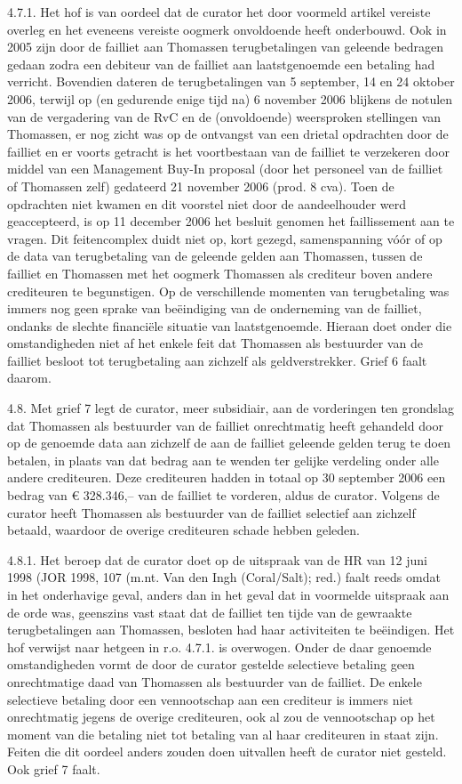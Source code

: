 \documentclass[
  dutch,
  a4paper,
]{article}
\begin{document}
4.7.1. Het hof is van oordeel dat de curator het door voormeld artikel vereiste overleg en het eveneens vereiste oogmerk onvoldoende heeft onderbouwd. Ook in 2005 zijn door de failliet aan Thomassen terugbetalingen van geleende bedragen gedaan zodra een debiteur van de failliet aan laatstgenoemde een betaling had verricht. Bovendien dateren de terugbetalingen van 5 september, 14 en 24 oktober 2006, terwijl op (en gedurende enige tijd na) 6 november 2006 blijkens de notulen van de vergadering van de RvC en de (onvoldoende) weersproken stellingen van Thomassen, er nog zicht was op de ontvangst van een drietal opdrachten door de failliet en er voorts getracht is het voortbestaan van de failliet te verzekeren door middel van een Management Buy-In proposal (door het personeel van de failliet of Thomassen zelf) gedateerd 21 november 2006 (prod. 8 cva). Toen de opdrachten niet kwamen en dit voorstel niet door de aandeelhouder werd geaccepteerd, is op 11 december 2006 het besluit genomen het faillissement aan te vragen. Dit feitencomplex duidt niet op, kort gezegd, samenspanning vóór of op de data van terugbetaling van de geleende gelden aan Thomassen, tussen de failliet en Thomassen met het oogmerk Thomassen als crediteur boven andere crediteuren te begunstigen. Op de verschillende momenten van terugbetaling was immers nog geen sprake van beëindiging van de onderneming van de failliet, ondanks de slechte financiële situatie van laatstgenoemde. Hieraan doet onder die omstandigheden niet af het enkele feit dat Thomassen als bestuurder van de failliet besloot tot terugbetaling aan zichzelf als geldverstrekker. Grief 6 faalt daarom.

4.8. Met grief 7 legt de curator, meer subsidiair, aan de vorderingen ten grondslag dat Thomassen als bestuurder van de failliet onrechtmatig heeft gehandeld door op de genoemde data aan zichzelf de aan de failliet geleende gelden terug te doen betalen, in plaats van dat bedrag aan te wenden ter gelijke verdeling onder alle andere crediteuren. Deze crediteuren hadden in totaal op 30 september 2006 een bedrag van € 328.346,-- van de failliet te vorderen, aldus de curator. Volgens de curator heeft Thomassen als bestuurder van de failliet selectief aan zichzelf betaald, waardoor de overige crediteuren schade hebben geleden.

4.8.1. Het beroep dat de curator doet op de uitspraak van de HR van 12 juni 1998 (JOR 1998, 107 (m.nt. Van den Ingh (Coral/Salt); red.) faalt reeds omdat in het onderhavige geval, anders dan in het geval dat in voormelde uitspraak aan de orde was, geenszins vast staat dat de failliet ten tijde van de gewraakte terugbetalingen aan Thomassen, besloten had haar activiteiten te beëindigen. Het hof verwijst naar hetgeen in r.o. 4.7.1. is overwogen. Onder de daar genoemde omstandigheden vormt de door de curator gestelde selectieve betaling geen onrechtmatige daad van Thomassen als bestuurder van de failliet. De enkele selectieve betaling door een vennootschap aan een crediteur is immers niet onrechtmatig jegens de overige crediteuren, ook al zou de vennootschap op het moment van die betaling niet tot betaling van al haar crediteuren in staat zijn. Feiten die dit oordeel anders zouden doen uitvallen heeft de curator niet gesteld. Ook grief 7 faalt.
\end{document}
